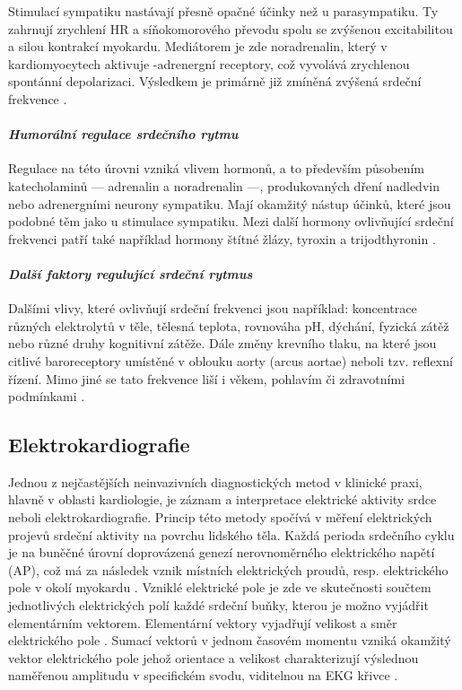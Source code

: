 Stimulací sympatiku nastávají přesně opačné účinky než u parasympatiku. Ty
zahrnují zrychlení HR a síňokomorového převodu spolu se zvýšenou excitabilitou a
silou kontrakcí myokardu. Mediátorem je zde noradrenalin, který v
kardiomyocytech aktivuje \textbeta-adrenergní receptory, což vyvolává zrychlenou
spontánní depolarizaci. Výsledkem je primárně již zmíněná zvýšená srdeční
frekvence \cite{Kittnar2020}.

\paragraph*{\textit{Humorální regulace srdečního rytmu}\\} Regulace na této
úrovni vzniká vlivem hormonů, a to především působením katecholaminů ---
adrenalin a noradrenalin ---, produkovaných dření nadledvin nebo adrenergními
neurony sympatiku. Mají okamžitý nástup účinků, které jsou podobné těm jako u
stimulace sympatiku. Mezi další hormony ovlivňující srdeční frekvenci patří také
například hormony štítné žlázy, tyroxin a trijodthyronin
\cite{Kittnar2020,Orel2019}.

\paragraph*{\textit{Další faktory regulující srdeční rytmus}\\} Dalšími vlivy,
které ovlivňují srdeční frekvenci jsou například: koncentrace různých
elektrolytů v těle, tělesná teplota, rovnováha pH, dýchání, fyzická zátěž nebo
různé druhy kognitivní zátěže. Dále změny krevního tlaku, na které jsou citlivé
baroreceptory umístěné v oblouku aorty (arcus aortae) neboli tzv. reflexní
řízení. Mimo jiné se tato frekvence liší i věkem, pohlavím či zdravotními
podmínkami \cite{Kittnar2020}.

\subsection{Elektrokardiografie}
\label{section:electrocardiography}
Jednou z nejčastějších neinvazivních diagnostických metod v klinické praxi,
hlavně v oblasti kardiologie, je záznam a interpretace elektrické aktivity srdce
neboli elektrokardiografie. Princip této metody spočívá v měření elektrických
projevů srdeční aktivity na povrchu lidského těla. Každá perioda srdečního cyklu
je na buněčné úrovní doprovázená genezí nerovnoměrného elektrického napětí (AP),
což má za následek vznik místních elektrických proudů, resp. elektrického pole v
okolí myokardu \cite{Kittnar2020}. Vzniklé elektrické pole je zde ve skutečnosti
součtem jednotlivých elektrických polí každé srdeční buňky, kterou je možno
vyjádřit elementárním vektorem. Elementární vektory vyjadřují velikost a směr
elektrického pole \cite{Stejfa2006}. Sumací vektorů v jednom časovém momentu
vzniká okamžitý vektor elektrického pole jehož orientace a velikost
charakterizují výslednou naměřenou amplitudu v specifickém svodu, viditelnou na
EKG křivce \cite{Surawicz2008,Kittnar2020}.

